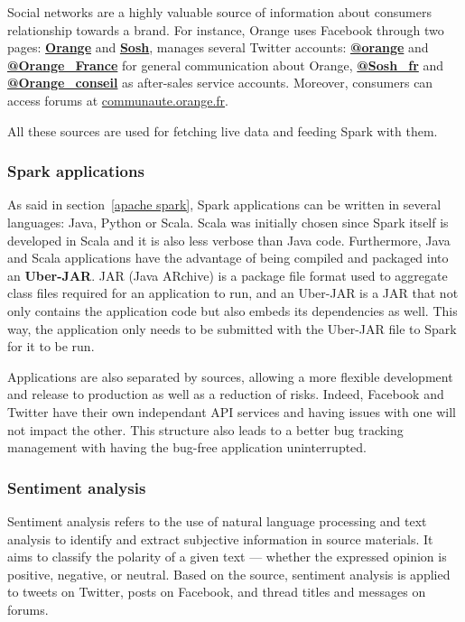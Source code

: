 \documentclass[11pt]{article}
\begin{document}
Social networks are a highly valuable source of information about consumers relationship towards a brand. For instance, Orange uses Facebook through two pages: \href{https://www.facebook.com/Orange.France/?ref=ts}{\textbf{Orange}} and \href{https://www.facebook.com/sosh/?fref=ts}{\textbf{Sosh}}, manages several Twitter accounts: \href{https://twitter.com/orange}{\textbf{@orange}} and \href{https://twitter.com/Orange_France}{\textbf{@Orange\_France}} for general communication about Orange, \href{https://twitter.com/Sosh_fr}{\textbf{@Sosh\_fr}} and \href{https://twitter.com/Orange_conseil}{\textbf{@Orange\_conseil}} as after-sales service accounts. Moreover, consumers can access forums at \href{https://communaute.orange.fr}{\url{communaute.orange.fr}}.

All these sources are used for fetching live data and feeding Spark with them.

\subsubsection{Spark applications}

As said in section~\ref{apache spark}, Spark applications can be written in several languages: Java, Python or Scala. Scala was initially chosen since Spark itself is developed in Scala and it is also less verbose than Java code. Furthermore, Java and Scala applications have the advantage of being compiled and packaged into an \textbf{Uber-JAR}. JAR (Java ARchive) is a package file format used to aggregate class files required for an application to run, and an Uber-JAR is a JAR that not only contains the application code but also embeds its dependencies as well. This way, the application only needs to be submitted with the Uber-JAR file to Spark for it to be run.

Applications are also separated by sources, allowing a more flexible development and release to production as well as a reduction of risks. Indeed, Facebook and Twitter have their own independant API services and having issues with one will not impact the other. This structure also leads to a better bug tracking management with having the bug-free application uninterrupted.

\subsubsection{Sentiment analysis}

Sentiment analysis refers to the use of natural language processing and text analysis to identify and extract subjective information in source materials. It aims to classify the polarity of a given text — whether the expressed opinion is positive, negative, or neutral. 
Based on the source, sentiment analysis is applied to tweets on Twitter, posts on Facebook, and thread titles and messages on forums.
\end{document}
